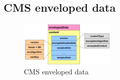\subsection{CMS enveloped data}

\begin{figure}[H]
  \centering
  \includegraphics[width=0.4\textwidth]{img/cms enveloped data.png}
  \caption{CMS enveloped data}
\end{figure}
